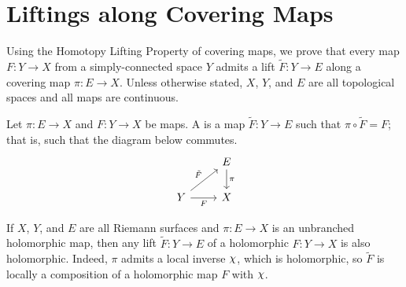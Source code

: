 \documentclass[../Moduli_Spaces_of_Riemann_Surfaces.tex]{subfiles}
\begin{document}
    \section{Liftings along Covering Maps}\label{CS:sec:liftings_of_maps}
    Using the Homotopy Lifting Property of covering maps, we prove that every map $F:Y\to X$ from a simply-connected space $Y$ admits a lift $\widetilde{F}:Y\to E$ along a covering map $\pi:E\to X$. Unless otherwise stated, $X$, $Y$, and $E$ are all topological spaces and all maps are continuous.
    \begin{definition}
        Let $\pi:E\to X$ and $F:Y\to X$ be maps. A  is a map $\widetilde{F}:Y\to E$ such that $\pi\circ\widetilde{F}=F$; that is, such that the diagram below commutes.
        \begin{equation*}
            \begin{tikzcd}
                & E \ar[d, "\pi"] \\
                Y \ar[ur, "\tilde{F}"] \ar[r, "F"'] & X
            \end{tikzcd}
        \end{equation*}
    \end{definition}
    \begin{remark}
        If $X$, $Y$, and $E$ are all Riemann surfaces and $\pi:E\to X$ is an unbranched holomorphic map, then any lift $\widetilde{F}:Y\to E$ of a holomorphic $F:Y\to X$ is also holomorphic. Indeed, $\pi$ admits a local inverse $\cchi$, which is holomorphic, so $\widetilde{F}$ is locally a composition of a holomorphic map $F$ with $\cchi$.\exqed
    \end{remark}
\end{document}
